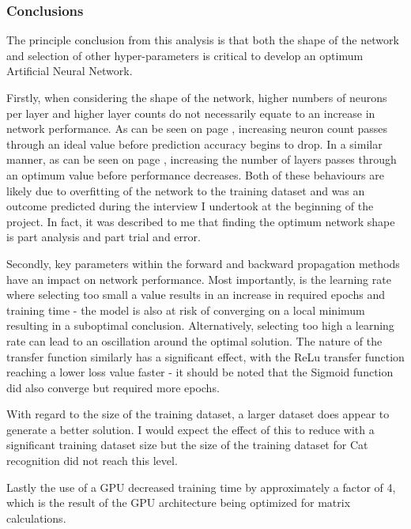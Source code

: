 \documentclass[./project-report/src/latex/project-report.tex]{subfiles}
\begin{document}
\label{sec:cpu-vs-gpu-analysis}



\subsubsection{Conclusions}

The principle conclusion from this analysis is that both the shape of the network and selection of other hyper-parameters is critical to develop an optimum Artificial Neural 
Network. 

Firstly, when considering the shape of the network, higher numbers of neurons per layer and higher layer counts do not necessarily equate to an increase in network 
performance. As can be seen on page \pageref{sec:neuron-count-analysis}, increasing neuron count passes through an ideal value before prediction accuracy begins to drop. In a 
similar manner, as can be seen on page \pageref{sec:layer-count-analysis}, increasing the number of layers passes through an optimum value before performance decreases. Both 
of these behaviours are likely due to overfitting of the network to the training dataset and was an outcome predicted during the interview I undertook at the beginning of the 
project. In fact, it was described to me that finding the optimum network shape is part analysis and part trial and error.

Secondly, key parameters within the forward and backward propagation methods have an impact on network performance. Most importantly, is the learning rate where selecting too 
small a value results in an increase in required epochs and training time - the model is also at risk of converging on a local minimum resulting in a suboptimal conclusion. 
Alternatively, selecting too high a learning rate can lead to an oscillation around the optimal solution. The nature of the transfer function similarly has a significant 
effect, with the ReLu transfer function reaching a lower loss value faster - it should be noted that the Sigmoid function did also converge but required more epochs.

With regard to the size of the training dataset, a larger dataset does appear to generate a better solution. I would expect the effect of this to reduce with a significant 
training dataset size but the size of the training dataset for Cat recognition did not reach this level.

Lastly the use of a GPU decreased training time by approximately a factor of 4, which is the result of the GPU architecture being optimized for matrix calculations.

\pagebreak
\end{document}
